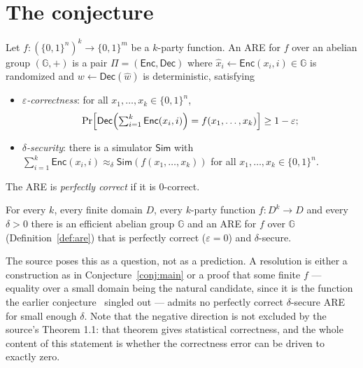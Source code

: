 \documentclass{aicr-conjecture}
\newcommand{\bits}{\{0,1\}}
\newcommand{\eps}{\varepsilon}
\newcommand{\Enc}{\mathsf{Enc}}
\newcommand{\Dec}{\mathsf{Dec}}
\newcommand{\Sim}{\mathsf{Sim}}
\newcommand{\Gr}{\mathbb{G}}
\begin{document}
\section{The conjecture}\label{sec:conjectures}

\begin{definition}\label{def:are}
Let $f : (\bits^{n})^{k} \to \bits^{m}$ be a $k$-party function. An ARE
for $f$ over an abelian group $(\Gr,+)$ is a pair $\Pi = (\Enc, \Dec)$
where $\hat{x}_{i} \leftarrow \Enc(x_{i}, i) \in \Gr$ is randomized and
$w \leftarrow \Dec(\hat{w})$ is deterministic, satisfying
\begin{itemize}[nosep]
  \item \emph{$\eps$-correctness}: for all $x_{1}, \dots, x_{k} \in
    \bits^{n}$,
    \[
      \Pr\Bigl[ \Dec\Bigl( \textstyle\sum_{i=1}^{k} \Enc(x_{i}, i)
      \Bigr) = f(x_{1}, \dots, x_{k}) \Bigr] \ge 1 - \eps;
    \]
  \item \emph{$\delta$-security}: there is a simulator $\Sim$ with
    $\sum_{i=1}^{k} \Enc(x_{i}, i) \approx_{\delta}
    \Sim(f(x_{1},\dots,x_{k}))$ for all $x_{1}, \dots, x_{k} \in
    \bits^{n}$.
\end{itemize}
The ARE is \emph{perfectly correct} if it is $0$-correct.
\end{definition}

\begin{conjecture}\label{conj:main}
For every $k$, every finite domain $D$, every $k$-party function $f :
D^{k} \to D$ and every $\delta > 0$ there is an efficient abelian group
$\Gr$ and an ARE for $f$ over $\Gr$ (Definition~\ref{def:are}) that is
perfectly correct ($\eps = 0$) and $\delta$-secure.
\end{conjecture}

\begin{remark}\label{rem:direction}
The source poses this as a question, not as a prediction. A resolution is
either a construction as in Conjecture~\ref{conj:main} or a proof that
some finite $f$ --- equality over a small domain being the natural
candidate, since it is the function the earlier
conjecture~\cite{HIKR23} singled out --- admits no perfectly correct
$\delta$-secure ARE for small enough $\delta$. Note that the negative
direction is not excluded by the source's Theorem 1.1: that theorem
gives statistical correctness, and the whole content of this statement is
whether the correctness error can be driven to exactly zero.
\end{remark}
\end{document}
